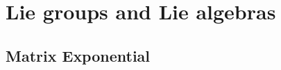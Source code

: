 \documentclass{book}
\theoremstyle{definition}
\begin{document}
   



































\newpage
\section{Lie groups and Lie algebras}




\subsection{Matrix Exponential}
\end{document}
